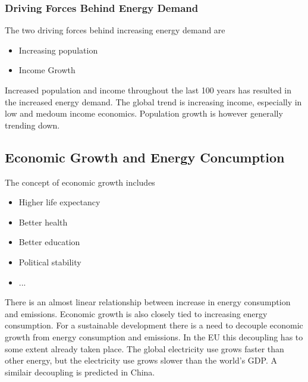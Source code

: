 \subsubsection{Driving Forces Behind Energy Demand}
The two driving forces behind increasing energy demand are

\begin{itemize}
    \item Increasing population
    \item Income Growth
\end{itemize}

Increased population and income throughout the last 100 years has resulted in the increased energy demand.
The global trend is increasing income, especially in low and medoum income economics.
Population growth is however generally trending down.

\subsection{Economic Growth and Energy Concumption}
The concept of economic growth includes

\begin{itemize}
    \item Higher life expectancy
    \item Better health
    \item Better education
    \item Political stability
    \item ...
\end{itemize}

There is an almost linear relationship between increase in energy consumption and \cotwo emissions.
Economic growth is also closely tied to increasing energy consumption.
For a sustainable development there is a need to decouple economic growth from energy consumption and \cotwo emissions.
In the EU this decoupling has to some extent already taken place.
The global electricity use grows faster than other energy, but the electricity use grows slower than the world's GDP.
A similair decoupling is predicted in China.


